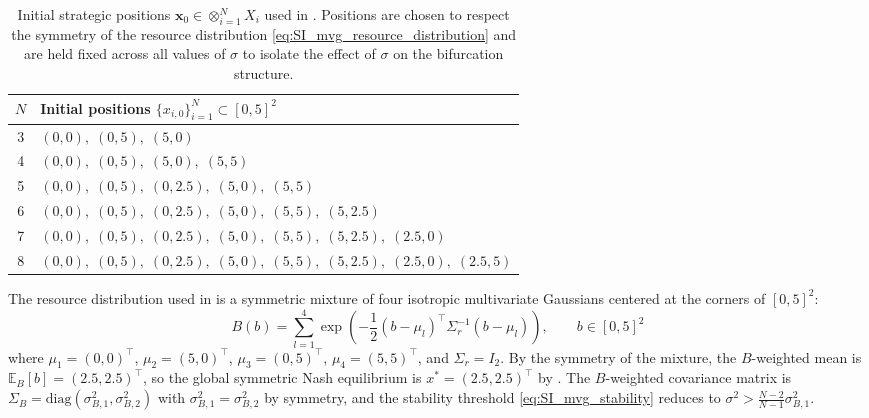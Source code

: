 \documentclass{article}
\begin{document}
    \begin{table}[ht!]
        \centering
        \caption{Initial strategic positions $\mathbf{x}_0 \in \otimes_{i=1}^N X_i$ used in . Positions are chosen to respect the symmetry of the resource distribution \cref{eq:SI_mvg_resource_distribution} and are held fixed across all values of $\sigma$ to isolate the effect of $\sigma$ on the bifurcation structure.}\label{tab:SI_mvg_initial_conditions}
        \begin{tabular}{cl}
            \toprule
            $N$ & Initial positions $\{x_{i,0}\}_{i=1}^N \subset [0,5]^2$ \\
            \midrule
            3 & $(0,0),\;(0,5),\;(5,0)$ \\
            4 & $(0,0),\;(0,5),\;(5,0),\;(5,5)$ \\
            5 & $(0,0),\;(0,5),\;(0,2.5),\;(5,0),\;(5,5)$ \\
            6 & $(0,0),\;(0,5),\;(0,2.5),\;(5,0),\;(5,5),\;(5,2.5)$ \\
            7 & $(0,0),\;(0,5),\;(0,2.5),\;(5,0),\;(5,5),\;(5,2.5),\;(2.5,0)$ \\
            8 & $(0,0),\;(0,5),\;(0,2.5),\;(5,0),\;(5,5),\;(5,2.5),\;(2.5,0),\;(2.5,5)$ \\
            \bottomrule
        \end{tabular}
    \end{table}

    The resource distribution used in  is a symmetric mixture of four isotropic multivariate Gaussians centered at the corners of $[0,5]^2$:\begin{equation}\label{eq:SI_mvg_resource_distribution}B(b) = \sum_{l=1}^{4}\exp\!\left(-\frac{1}{2}(b - \mu_l)^\top \Sigma_r^{-1}(b - \mu_l)\right), \qquad b \in [0,5]^2\end{equation}where $\mu_1 = (0,0)^\top$, $\mu_2 = (5,0)^\top$, $\mu_3 = (0,5)^\top$, $\mu_4 = (5,5)^\top$, and $\Sigma_r = I_2$. By the symmetry of the mixture, the $B$-weighted mean is $\mathbb{E}_B[b] = (2.5, 2.5)^\top$, so the global symmetric Nash equilibrium is $x^* = (2.5, 2.5)^\top$ by . The $B$-weighted covariance matrix is $\Sigma_B = \mathrm{diag}(\sigma_{B,1}^2, \sigma_{B,2}^2)$ with $\sigma_{B,1}^2 = \sigma_{B,2}^2$ by symmetry, and the stability threshold \cref{eq:SI_mvg_stability} reduces to $\sigma^2 > \frac{N-2}{N-1}\sigma_{B,1}^2$.
    \clearpage
\end{document}
